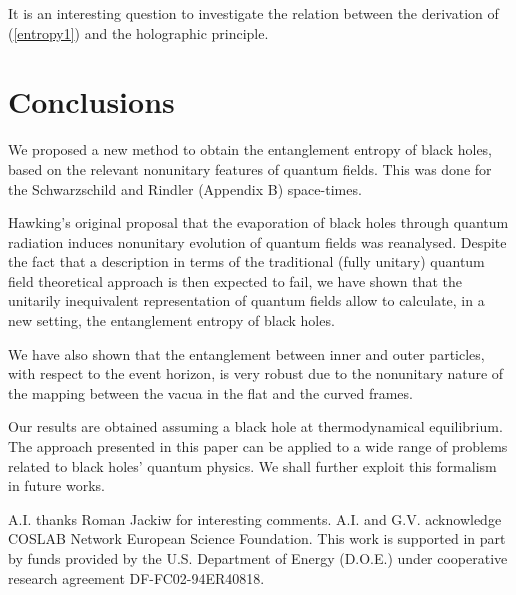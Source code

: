  It is an interesting question to investigate the relation
between the derivation of (\ref{entropy1}) and the holographic
principle.


\section{Conclusions}

 We proposed a new method to obtain the entanglement
entropy of black holes, based on the relevant nonunitary features of 
quantum fields. This was done for the Schwarzschild and Rindler (Appendix
B) space-times.

 Hawking's original proposal \cite{HAW} that the
evaporation of black holes through quantum radiation induces
nonunitary evolution of quantum fields was reanalysed. Despite the
fact that a description in terms of
the traditional (fully unitary) quantum field theoretical approach 
is then expected to fail, we have shown that
the unitarily inequivalent representation of quantum
fields allow to calculate, in a new setting, the entanglement
entropy of black holes. 

 We have also shown that the entanglement
between inner and outer particles, with respect to the event
horizon, is very robust due to the nonunitary nature of
the mapping between the vacua in the flat and the curved frames.

 Our results are obtained assuming a black hole at
thermodynamical equilibrium. The approach presented in this paper
can be applied to a wide range of problems related to black holes'
quantum physics. We shall further exploit this formalism in future
works.

\acknowledgments

 A.I. thanks Roman Jackiw for interesting comments. A.I. and G.V. 
acknowledge COSLAB Network European Science Foundation. This work is 
supported in part by funds provided by the U.S. Department of Energy 
(D.O.E.) under cooperative research agreement DF-FC02-94ER40818.

\appendixa

